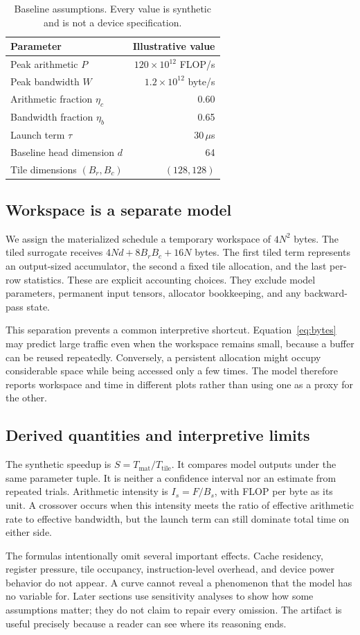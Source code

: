 \begin{table}[t]
 \caption{Baseline assumptions. Every value is synthetic and is not a device specification.}
 \label{tab:parameters}\centering
 \begin{tabular}{lr}\toprule
 Parameter & Illustrative value\\\midrule
 Peak arithmetic $P$ & $120\times10^{12}$ FLOP/s\\
 Peak bandwidth $W$ & $1.2\times10^{12}$ byte/s\\
 Arithmetic fraction $\eta_c$ & 0.60\\
 Bandwidth fraction $\eta_b$ & 0.65\\
 Launch term $\tau$ & $30\,\mu$s\\
 Baseline head dimension $d$ & 64\\
 Tile dimensions $(B_r,B_c)$ & $(128,128)$\\\bottomrule
 \end{tabular}
\end{table}

\subsection{Workspace is a separate model}
We assign the materialized schedule a temporary workspace of $4N^2$ bytes. The tiled surrogate receives $4Nd+8B_rB_c+16N$ bytes. The first tiled term represents an output-sized accumulator, the second a fixed tile allocation, and the last per-row statistics. These are explicit accounting choices. They exclude model parameters, permanent input tensors, allocator bookkeeping, and any backward-pass state.

This separation prevents a common interpretive shortcut. Equation~\ref{eq:bytes} may predict large traffic even when the workspace remains small, because a buffer can be reused repeatedly. Conversely, a persistent allocation might occupy considerable space while being accessed only a few times. The model therefore reports workspace and time in different plots rather than using one as a proxy for the other.

\subsection{Derived quantities and interpretive limits}
The synthetic speedup is $S=T_{\mathrm{mat}}/T_{\mathrm{tile}}$. It compares model outputs under the same parameter tuple. It is neither a confidence interval nor an estimate from repeated trials. Arithmetic intensity is $I_s=F/B_s$, with FLOP per byte as its unit. A crossover occurs when this intensity meets the ratio of effective arithmetic rate to effective bandwidth, but the launch term can still dominate total time on either side.

The formulas intentionally omit several important effects. Cache residency, register pressure, tile occupancy, instruction-level overhead, and device power behavior do not appear. A curve cannot reveal a phenomenon that the model has no variable for. Later sections use sensitivity analyses to show how some assumptions matter; they do not claim to repair every omission. The artifact is useful precisely because a reader can see where its reasoning ends.
